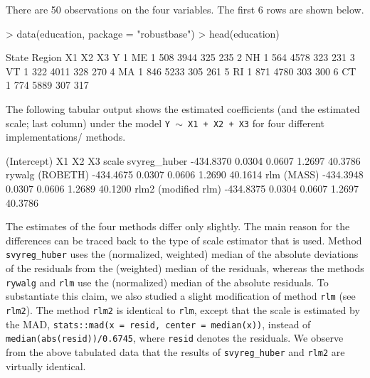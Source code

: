 \documentclass[a4paper]{scrartcl}
\begin{document}
\noindent There are 50 observations on the four variables. The first 6 rows are shown below. 
\begin{Schunk}
\begin{Sinput}
> data(education, package = "robustbase")
> head(education)
\end{Sinput}
\begin{Soutput}
  State Region  X1   X2  X3   Y
1    ME      1 508 3944 325 235
2    NH      1 564 4578 323 231
3    VT      1 322 4011 328 270
4    MA      1 846 5233 305 261
5    RI      1 871 4780 303 300
6    CT      1 774 5889 307 317
\end{Soutput}
\end{Schunk}

\noindent The following tabular output shows the estimated coefficients (and the estimated scale; last column) under the model \texttt{Y $\sim$ X1 + X2 + X3} for four different implementations/ methods. 
\begin{Schunk}
\begin{Soutput}
                    (Intercept)     X1     X2     X3   scale
svyreg_huber          -434.8370 0.0304 0.0607 1.2697 40.3786
rywalg (ROBETH)       -434.4675 0.0307 0.0606 1.2690 40.1614
rlm (MASS)            -434.3948 0.0307 0.0606 1.2689 40.1200
rlm2 (modified rlm)   -434.8375 0.0304 0.0607 1.2697 40.3786
\end{Soutput}
\end{Schunk}

\noindent The estimates of the four methods differ only slightly. The main reason for the differences can be traced back to the type of scale estimator that is used. Method \texttt{svyreg\_huber} uses the (normalized, weighted) median of the absolute deviations of the residuals from the (weighted) median of the residuals, whereas the methods \texttt{rywalg} and \texttt{rlm} use the (normalized) median of the absolute residuals. To substantiate this claim, we also studied a slight modification of method \texttt{rlm} (see \texttt{rlm2}). The method \texttt{rlm2} is identical to \texttt{rlm}, except that the scale is estimated by the MAD, \texttt{stats::mad(x = resid, center = median(x))}, instead of \texttt{median(abs(resid))/0.6745}, where \texttt{resid} denotes the residuals. We observe from the above tabulated data that the results of \texttt{svyreg\_huber} and \texttt{rlm2} are virtually identical.


\end{document}
